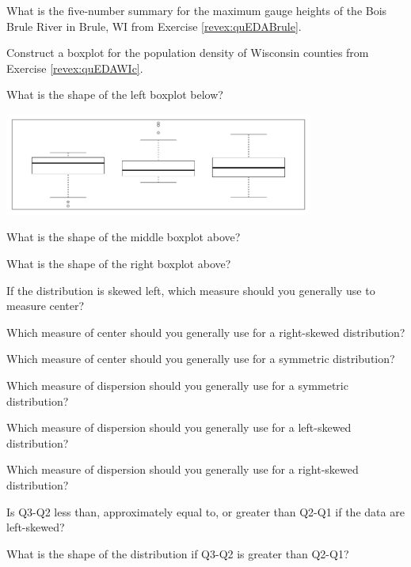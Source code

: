 \begin{exsection}
  \item \label{revex:quEDABrule5N} What is the five-number summary for the maximum gauge heights of the Bois Brule River in Brule, WI from Exercise \ref{revex:quEDABrule}. 
  \item \label{revex:quEDAWI5N} \rhw{} Construct a boxplot for the population density of Wisconsin counties from Exercise \ref{revex:quEDAWIc}. 
  \item \label{revex:quEDABoxLeft} What is the shape of the left boxplot below? 

\begin{center}
  \includegraphics[width=4in]{Figs/BoxplotQuest-1}
\end{center}

  \item \label{revex:quEDABoxRight} What is the shape of the middle boxplot above? 
  \item \label{revex:quEDABoxSym} What is the shape of the right boxplot above? 
  \item \label{revex:quEDALSkewCtr} If the distribution is skewed left, which measure should you generally use to measure center? 
  \item \label{revex:quEDARSkewCtr} Which measure of center should you generally use for a right-skewed distribution? 
  \item \label{revex:quEDASymCtr} Which measure of center should you generally use for a symmetric distribution? 
  \item \label{revex:quEDASymDisp} Which measure of dispersion should you generally use for a symmetric distribution? 
  \item \label{revex:quEDALSkewDisp} Which measure of dispersion should you generally use for a left-skewed distribution? 
  \item \label{revex:quEDARSkewDisp} Which measure of dispersion should you generally use for a right-skewed distribution? 
  \item \label{revex:quEDAQShape1} Is Q3-Q2 less than, approximately equal to, or greater than Q2-Q1 if the data are left-skewed? 
  \item \label{revex:quEDAQShape2} What is the shape of the distribution if Q3-Q2 is greater than Q2-Q1? 
\end{exsection}


